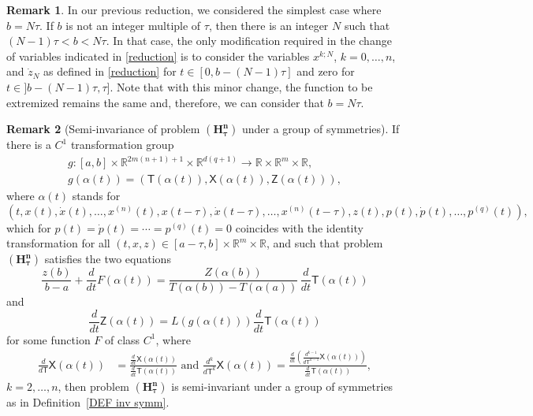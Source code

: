 \documentclass{my-aims}
\theoremstyle{definition}
\newtheorem{remark}{Remark}
\begin{document}
\begin{remark}
\label{rem:red:bN}
In our previous reduction, we considered the simplest case where $b=N\tau$.
If $b$ is not an integer multiple of $\tau$, then there is an integer $N$
such that $(N-1)\tau<b<N\tau$. In that case, the only modification required
in the change of variables indicated in \eqref{reduction} is to consider the 
variables $x^{k;N}$, $k=0, \dots, n$, and $\dot{z}_N$ as defined in \eqref{reduction}
for $t \in [0,b-(N-1)\tau]$ and zero for $t\in ]b-(N-1)\tau, \tau]$. Note that with this
minor change, the function to be extremized remains the same and, therefore,  
we can consider that $b=N\tau$.
\end{remark}

\begin{remark}[Semi-invariance of problem $\mathbf{(H_\tau^n)}$ under a group of symmetries]
If there is a $C^1$ transformation group
\begin{equation}
\label{eq:g}
\begin{gathered}
g:[a,b]\times\mathbb{R}^{2m(n+1)+1}\times\mathbb{R}^{d (q+1)}
\rightarrow\mathbb{R}\times\mathbb{R}^m\times \mathbb{R},\\
g(\alpha(t))=\left(\mathsf{T}(\alpha(t)),\mathsf{X}(\alpha(t)),\mathsf{Z}(\alpha(t))\right),
\end{gathered}
\end{equation}
where $\alpha(t)$ stands for
\begin{equation*}
\left(t,x(t),\dot{x}(t),\dots,x^{(n)}(t),x(t-\tau),\dot{x}(t-\tau),
\dots,x^{(n)}(t-\tau),z(t),p(t),\dot{p}(t),\dots,p^{(q)}(t)\right),
\end{equation*}
which for $p(t)=\dot{p}(t)=\cdots=p^{(q)}(t)=0$ coincides 
with the identity transformation for all $(t,x,z)\in[a-\tau,b]
\times \mathbb{R}^m\times \mathbb{R}$, and such that problem 
$\mathbf{(H_\tau^n)}$ satisfies the two equations
\begin{equation}
\label{invariance H_tau^n EQ1}
\frac{z(b)}{b-a} + \frac{d}{dt}F(\alpha(t))
= \frac{Z(\alpha(b))}{T(\alpha(b))-T(\alpha(a))}\,\frac{d}{dt}\mathsf{T}(\alpha(t))
\end{equation}
and
\begin{equation}
\label{invariance H_tau^n EQ2}
\frac{d}{dt}\mathsf{Z}(\alpha(t))=L(g(\alpha(t)))\frac{d}{dt}\mathsf{T}(\alpha(t))
\end{equation}
for some function $F$ of class $C^1$, where
\begin{equation*}
\begin{split}
\frac{d}{d\mathsf{T}}\mathsf{X}(\alpha(t))
&=\frac{\frac{d}{dt}\mathsf{X}(\alpha(t))}{
\frac{d}{dt}\mathsf{T}(\alpha(t))} \text{ and }
\frac{d^k}{d\mathsf{T}^k}\mathsf{X}(\alpha(t))
=\frac{\frac{d}{dt}\left(\frac{d^{k-1}}{d\mathsf{T}^{k-1}}
\mathsf{X}(\alpha(t))\right)}{\frac{d}{dt}\mathsf{T}(\alpha(t))},
\end{split}
\end{equation*}
$k=2,\ldots,n$, then problem $\mathbf{(H_\tau^n)}$ is semi-invariant 
under a group of symmetries as in Definition~\ref{DEF inv symm}.
\end{remark}
\end{document}
